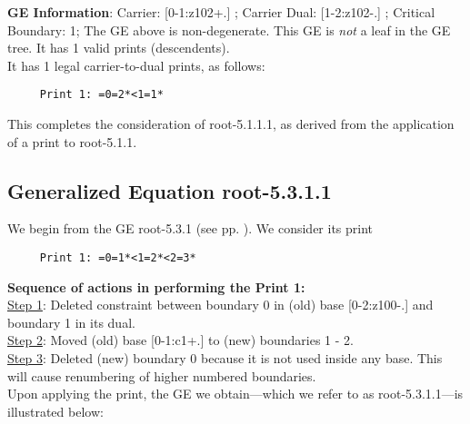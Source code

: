 \documentclass[final]{article}
\begin{document}
{\bf GE Information}:  
Carrier: [0-1:z102+.] ;  
Carrier Dual: [1-2:z102-.] ;  
Critical Boundary: 1;  
The GE above is non-degenerate.  This GE is {\em not} a leaf in the GE tree.   It has 1 valid prints (descendents).  \\[0.1in]
   It has 1 legal carrier-to-dual prints, as follows:
\begin{verbatim}
     Print 1: =0=2*<1=1*
\end{verbatim}
This completes the consideration of root-5.1.1.1, as derived from the application of a print to root-5.1.1.\\[0.1in]
\subsection*{Generalized Equation root-5.3.1.1}
\label{root-5.3.1.1}We begin from the GE root-5.3.1 (see pp. \pageref{root-5.3.1}).  {We consider its print}
\begin{verbatim}
     Print 1: =0=1*<1=2*<2=3*
\end{verbatim}
{\bf Sequence of actions in performing the Print 1:}\\
{\underline{Step 1}:} Deleted constraint between boundary 0 in (old) base [0-2:z100-.]  and boundary 1 in its dual.\\
{\underline{Step 2}:} Moved (old) base [0-1:c1+.]  to (new) boundaries 1 - 2.\\
{\underline{Step 3}:} Deleted (new) boundary 0 because it is not used inside any base.  This will cause renumbering of higher numbered boundaries.
\\[0.1in]
{Upon applying the print, the GE we obtain---which we refer to as root-5.3.1.1---is illustrated below:}
\end{document}
